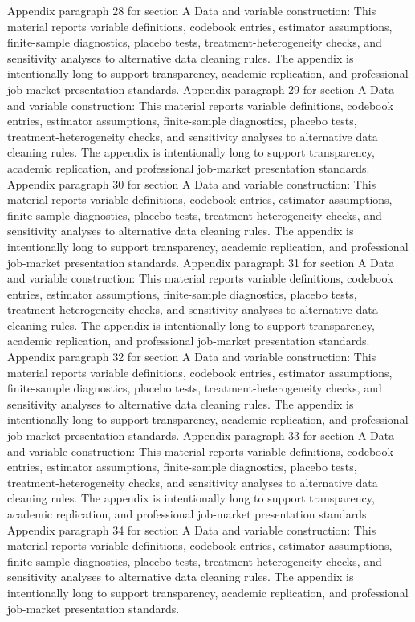 \documentclass[preprint,12pt]{elsarticle}
\begin{document}
Appendix paragraph 28 for section A Data and variable construction: This material reports variable definitions, codebook entries, estimator assumptions, finite-sample diagnostics, placebo tests, treatment-heterogeneity checks, and sensitivity analyses to alternative data cleaning rules. The appendix is intentionally long to support transparency, academic replication, and professional job-market presentation standards.
Appendix paragraph 29 for section A Data and variable construction: This material reports variable definitions, codebook entries, estimator assumptions, finite-sample diagnostics, placebo tests, treatment-heterogeneity checks, and sensitivity analyses to alternative data cleaning rules. The appendix is intentionally long to support transparency, academic replication, and professional job-market presentation standards.
Appendix paragraph 30 for section A Data and variable construction: This material reports variable definitions, codebook entries, estimator assumptions, finite-sample diagnostics, placebo tests, treatment-heterogeneity checks, and sensitivity analyses to alternative data cleaning rules. The appendix is intentionally long to support transparency, academic replication, and professional job-market presentation standards.
Appendix paragraph 31 for section A Data and variable construction: This material reports variable definitions, codebook entries, estimator assumptions, finite-sample diagnostics, placebo tests, treatment-heterogeneity checks, and sensitivity analyses to alternative data cleaning rules. The appendix is intentionally long to support transparency, academic replication, and professional job-market presentation standards.
Appendix paragraph 32 for section A Data and variable construction: This material reports variable definitions, codebook entries, estimator assumptions, finite-sample diagnostics, placebo tests, treatment-heterogeneity checks, and sensitivity analyses to alternative data cleaning rules. The appendix is intentionally long to support transparency, academic replication, and professional job-market presentation standards.
Appendix paragraph 33 for section A Data and variable construction: This material reports variable definitions, codebook entries, estimator assumptions, finite-sample diagnostics, placebo tests, treatment-heterogeneity checks, and sensitivity analyses to alternative data cleaning rules. The appendix is intentionally long to support transparency, academic replication, and professional job-market presentation standards.
Appendix paragraph 34 for section A Data and variable construction: This material reports variable definitions, codebook entries, estimator assumptions, finite-sample diagnostics, placebo tests, treatment-heterogeneity checks, and sensitivity analyses to alternative data cleaning rules. The appendix is intentionally long to support transparency, academic replication, and professional job-market presentation standards.
\end{document}
